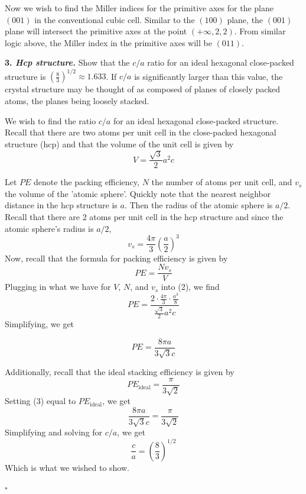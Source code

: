 \documentclass{article}
\begin{document}
Now we wish to find the Miller indices for the primitive axes for the plane $(001)$ in the conventional cubic cell. Similar to the $(100)$ plane, the $(001)$ plane will intersect the primitive axes at the point $(+\infty,2,2)$. From similar logic above, the Miller index in the primitive axes will be
$(011)$.
\newline\newline

\textbf{3. \textit{Hcp structure.}} Show that the $c/a$ ratio for an ideal hexagonal close-packed structure is $\left(\frac{8}{3}\right)^{1/2} \approx 1.633$. If $c/a$ is significantly larger than this value, the crystal structure may be thought of as composed of planes of closely packed atoms, the planes being loosely stacked.
\newline\newline

We wish to find the ratio $c/a$ for an ideal hexagonal close-packed structure. Recall that there are two atoms per unit cell in the close-packed hexagonal structure (hcp) and that the volume of the unit cell is given by
\[V = \frac{\sqrt{3}}{2}a^2c\]

Let $PE$ denote the packing efficiency, $N$ the number of atoms per unit cell, and $v_s$ the volume of the 'atomic sphere'. Quickly note that the nearest neighbor distance in the hcp structure is $a$. Then the radius of the atomic sphere is $a/2$. Recall that there are $2$ atoms per unit cell in the hcp structure and since the atomic sphere's radius is $a/2$,
\[v_s = \frac{4\pi}{3}\left(\frac{a}{2}\right)^3\]
Now, recall that the formula for packing efficiency is given by
\begin{equation}
    PE = \frac{Nv_s}{V}
\end{equation}
Plugging in what we have for $V$, $N$, and $v_s$ into (2), we find
\[PE = \frac{2 \cdot \frac{4\pi}{3}\cdot \frac{a^3}{8}}{\frac{\sqrt{3}}{2}a^2c}\]
Simplifying, we get

\begin{equation}
    PE = \frac{8\pi a}{3\sqrt{3}c}
\end{equation}

Additionally, recall that the ideal stacking efficiency is given by
\[PE_{\text{ideal}} = \frac{\pi}{3\sqrt{2}}\]
Setting (3) equal to $PE_{\text{ideal}}$, we get
\[\frac{8\pi a}{3 \sqrt{3}c} = \frac{\pi}{3\sqrt{2}}\]
Simplifying and solving for $c/a$, we get
\[\frac{c}{a} = \left(\frac{8}{3}\right)^{1/2}\]
Which is what we wished to show.
\begin{flushright}
    $\square$
\end{flushright}
\end{document}
